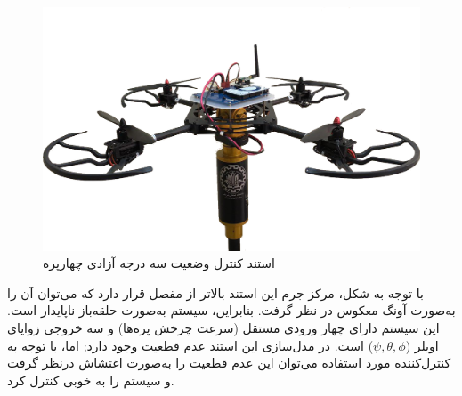 \begin{figure}[H]\label{LabQuad}
	\includegraphics[width=13cm]{../Figures/introduction/3DOFQuad.png}
	\centering
	\caption{استند کنترل وضعیت سه درجه آزادی چهارپره 
	\cite{Iranlabexpo}}
\end{figure}
با توجه به شکل، مرکز جرم این استند بالاتر از مفصل قرار دارد که می‌توان آن را به‌صورت آونگ معکوس در نظر گرفت. بنابراین، سیستم به‌صورت حلقه‌باز ناپایدار است. این سیستم دارای چهار ورودی مستقل (سرعت چرخش پره‌ها) و سه خروجی زوایای اویلر ($\psi, \theta, \phi$) است. در مدل‌سازی این استند عدم قطعیت وجود دارد; اما، با توجه به کنترل‌کننده مورد استفاده می‌توان این عدم قطعیت را به‌صورت اغتشاش درنظر گرفت و سیستم را به خوبی کنترل کرد. 


%
